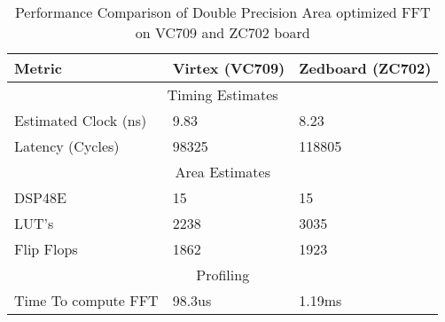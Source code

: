 \begin{table}[!h]
\centering
\begin{tabular}{||m{5.5cm}|m{4cm}|m{4cm}||}
\hline
Metric & Virtex (VC709) & Zedboard (ZC702)  \\
\hline
\multicolumn{3}{||c||}{Timing Estimates}\\
\hline
Estimated Clock (ns) & 9.83 & 8.23\\
\hline
Latency (Cycles) &98325&118805\\
\hline
\multicolumn{3}{||c||}{Area Estimates}\\\cline{1-3}

DSP48E & 15 & 15\\
\hline
LUT's &2238 & 3035\\
\hline
Flip Flops  &1862 & 1923\\
\hline
\multicolumn{3}{||c||}{Profiling}\\
\hline
Time To compute FFT &98.3us& 1.19ms\\
\hline
\end{tabular}
\caption{Performance Comparison of Double Precision Area optimized FFT on VC709 and ZC702 board}
\label{Table 4.3}
\end{table}
